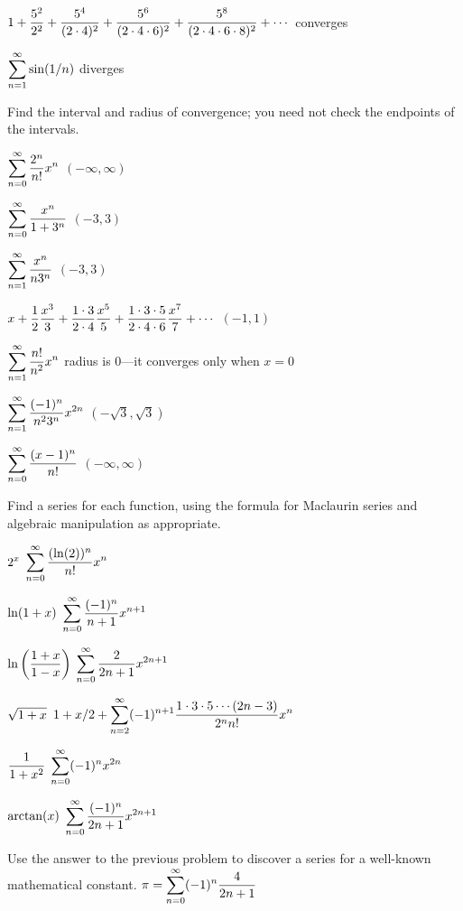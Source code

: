 \exercise $\displaystyle 1+ {5^2\over 2^2}+{5^4\over (2\cdot4)^2}
 +{5^6\over(2\cdot4\cdot6)^2}+ {5^8\over(2\cdot4\cdot6\cdot8)^2}+\cdots$
\answer converges
\endanswer
\endexercise

\exercise $\displaystyle \sum_{n=1}^\infty \sin(1/n)$
\answer diverges
\endanswer

\texonly
\vskip50pt\vskip-50pt
\endtexonly
\msk\noindent
Find the interval and radius of convergence; you need not check the
endpoints of the intervals.
\endexercise

\exercise $\displaystyle\sum_{n=0}^\infty {2^n\over n!}x^n$
\answer $(-\infty,\infty)$
\endanswer
\endexercise

\exercise $\displaystyle\sum_{n=0}^\infty {x^n\over 1+3^n}$
\answer $(-3,3)$
\endanswer
\endexercise

\exercise $\displaystyle\sum_{n=1}^\infty {x^n\over n3^n}$
\answer $(-3,3)$
\endanswer
\endexercise

\exercise $\displaystyle x+{1\over 2}{x^3\over3} + {1\cdot 3\over 2\cdot4}{x^5\over5}+
{1\cdot 3\cdot5\over 2\cdot4\cdot6}{x^7\over7}+\cdots$
\answer $(-1,1)$
\endanswer
\endexercise

\exercise $\displaystyle\sum_{n=1}^\infty {n!\over n^2} x^n$
\answer radius is $0$---it converges only when $x=0$
\endanswer
\endexercise

\exercise $\displaystyle\sum_{n=1}^\infty {(-1)^n\over n^2 3^n} x^{2n}$
\answer $(-\sqrt3,\sqrt3)$
\endanswer
\endexercise

\exercise $\displaystyle\sum_{n=0}^\infty {(x-1)^n\over n!}$
\answer $(-\infty,\infty)$
\endanswer

\msk\noindent
Find a series for each function, using the formula for Maclaurin
series and algebraic manipulation as appropriate.
\endexercise

\exercise $\displaystyle 2^x$
\answer $\displaystyle\sum_{n=0}^\infty {(\ln(2))^n\over n!}x^n$
\endanswer
\endexercise

\exercise $\displaystyle \ln(1+x)$
\answer $\displaystyle\sum_{n=0}^\infty {(-1)^n\over n+1}x^{n+1}$
\endanswer
\endexercise

\exercise $\displaystyle \ln\left({1+x\over 1-x}\right)$
\answer $\displaystyle \sum_{n=0}^\infty {2\over 2n+1}x^{2n+1}$
\endanswer
\endexercise

\exercise $\displaystyle \sqrt{1+x}$
\answer $\displaystyle 1+ x/2+\sum_{n=2}^\infty (-1)^{n+1}
{1\cdot3\cdot5\cdots(2n-3)\over2^n n!}x^n$
\endanswer
\endexercise

\exercise $\displaystyle {1\over 1+x^2}$
\answer $\displaystyle \sum_{n=0}^\infty (-1)^n x^{2n}$
\endanswer
\endexercise

\exercise $\displaystyle \arctan(x)$
\answer $\displaystyle \sum_{n=0}^\infty {(-1)^n\over 2n+1} x^{2n+1}$
\endanswer
\endexercise

\exercise Use the answer to the previous problem to discover a series
for a well-known mathematical constant.
\answer $\pi = \displaystyle \sum_{n=0}^\infty (-1)^n{4\over 2n+1}$
\endanswer
\endexercise

\endexercises

